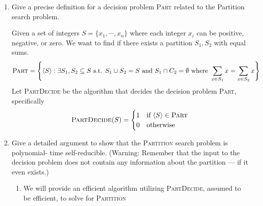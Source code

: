 \documentclass[11pt]{article}
\begin{document}
\begin{enumerate}
    \item  Give a precise definition for a decision problem \textsc{Part} related to the Partition search problem.
    \begin{solution}
        Given a set of integers $S = \{ x_1, \cdots, x_n \}$ where each integer $x_i$ can be positive, negative, or zero. We want to find if there exists a partition $S_1,S_2$ with equal sums. 
        \[
            \textsc{Part} = \left\{ \langle S \rangle : \exists S_1,S_2 \subseteq S \text{ s.t. } S_1\cup S_2 = S \text{ and } S_1 \cap C_2 = \emptyset \text{ where } \sum_{x\in S_1} x = \sum_{x\in S_2} x   \right\}
        \]
        Let \textsc{PartDecide} be the algorithm that decides the decision problem \textsc{Part}, specifically 
        \[
            \textsc{PartDecide}(S)=
            \begin{cases}
                1 & \text{if } \langle S \rangle \in \textsc{Part}\\
                0 & \text{otherwise}\\
            \end{cases}
        \] 
    \end{solution}
    \item Give a detailed argument to show that the \textsc{Partition} search problem is polynomial- time self-reducible. (Warning: Remember that the input to the decision problem does not contain any information about the partition — if it even exists.)
    \begin{solution}
        
        \begin{enumerate}
            \item We will provide an efficient algorithm utilizing \textsc{PartDecide}, assumed to be efficient, to solve for \textsc{Partition} \\ 
            \begin{algorithm}[H]

            \end{algorithm}


\end{enumerate}
\end{solution}
\end{enumerate}
\end{document}
